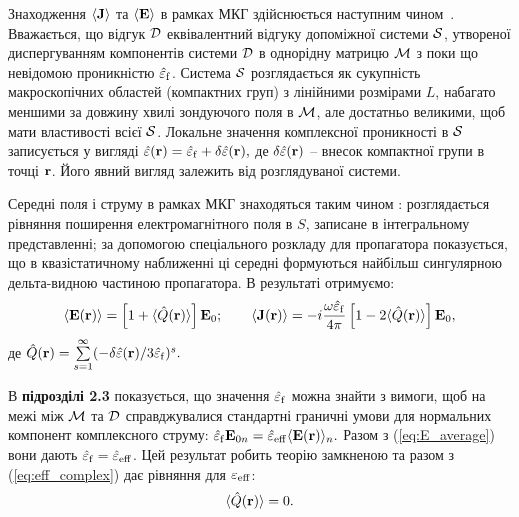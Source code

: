 \documentclass[twoside,a4paper,14pt]{vakaref}
\begin{document}
Знаходження $\langle {\bf{J}}\rangle$ та $\langle {\bf{E}} \rangle$ в рамках МКГ здійснюється наступним чином~\cite{Sushko2017}. Вважається, що відгук $\cal{D}$ еквівалентний відгуку допоміжної системи $\cal{S}$, утвореної диспергуванням компонентів системи $\cal{D}$ в однорідну матрицю $\cal{M}$ з поки що невідомою проникністю $\hat{\varepsilon}_{\rm f}$. Система $\cal{S}$ розглядається як сукупність макроскопічних областей (компактних груп) з лінійними розмірами $L$, набагато меншими за довжину хвилі зондуючого поля в $\cal{M}$, але достатньо великими, щоб мати властивості всієї $\cal{S}$. Локальне значення комплексної проникності в $\cal S$ записується у вигляді
$\label{eq:local_perm}
\hat{\varepsilon} ({\bf r}) = \hat{\varepsilon}_{\rm f} + \delta\hat{\varepsilon} ({\bf r}),
$
де $\delta\hat{\varepsilon} ({\bf r})$ -- внесок компактної групи в точці ${\bf r}$. Його явний вигляд залежить від розглядуваної системи. 

Середні поля і струму в рамках МКГ знаходяться таким чином \cite{Sushko2007, Sushko2009, SushkoJPD2009, Sushko2017}: розглядається рівняння поширення електромагнітного поля в $S$, записане в інтегральному представленні; за допомогою спеціального розкладу \cite{Weighofer1989} для пропагатора показується, що в квазістатичному наближенні ці середні формуються найбільш сингулярною дельта-видною частиною пропагатора. В результаті отримуємо:
\begin{equation}\label{eq:E_average}
\langle {\bf E} ({\bf r}) \rangle =  \left[ 1 + \langle \hat{Q}({\bf r}) \rangle \right] {\bf E}_0;\qquad
\langle {\bf J} ({\bf r}) \rangle = - i  \frac{\omega\hat{\varepsilon}_{\rm f}}{4\pi} \left[ 1 - 2\langle \hat{Q}({\bf r}) \rangle \right] {\bf E}_0,
\end{equation}
де 
$\label{eq:Q}
\hat{Q}({\bf r}) = \sum\limits_{s=1}^{\infty}  (-\delta\hat{\varepsilon}({\bf r})/3\hat{\varepsilon}_{\rm f})^s.
$

В {\bf підрозділі 2.3} показується, що значення $\hat{\varepsilon}_{\rm f}$ можна знайти з вимоги, щоб на межі між $\cal{M}$ та $\cal{D}$ справджувалися стандартні граничні умови для нормальних компонент комплексного струму:
$\label{eq:boundary}
\hat{\varepsilon}_{\rm f} {\bf E}_{0n} = \hat{\varepsilon}_{\rm eff} \langle {\bf E}({\bf r}) \rangle_n.
$
Разом з (\ref{eq:E_average}) вони дають $\hat{\varepsilon}_{\rm f} = \hat{\varepsilon}_{\rm eff}$. Цей результат робить теорію замкненою та разом з (\ref{eq:eff_complex})
дає рівняння для $\varepsilon_{\rm eff}$:
\begin{equation}\label{eq:general_Q}
\langle \hat{Q}({\bf r}) \rangle = 0.
\end{equation}
\end{document}
